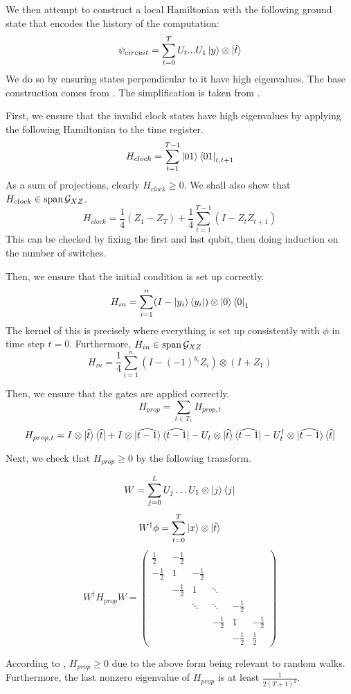 We then attempt to construct a local Hamiltonian with the following ground state that encodes the history of the computation: $$\psi_{circuit}=\sum_{t=0}^TU_t...U_1\ket{y}\otimes\ket{\hat{t}}$$
We do so by ensuring states perpendicular to it have high eigenvalues. The base construction comes from \cite{kitaev2002classical}. The simplification is taken from \cite{PhysRevA.78.012352}.

First, we ensure that the invalid clock states have high eigenvalues by applying the following Hamiltonian to the time register.
$$H_{clock}=\sum_{t=1}^{T-1}\ket{01}\bra{01}_{t,t+1}$$
As a sum of projections, clearly $H_{clock}\geq 0$. We shall also show that $H_{clock}\in\operatorname*{\operatorname{span}}\mathcal{G}_{XZ}$.
$$H_{clock}=\frac{1}{4}(Z_1 - Z_T) + \frac{1}{4}\sum_{t=1}^{T-1}(I-Z_tZ_{t+1}) $$
This can be checked by fixing the first and last qubit, then doing induction on the number of switches.

Then, we ensure that the initial condition is set up correctly.
$$H_{in}=\sum_{i=1}^n(I-\ket{y_i}\bra{y_i})\otimes\ket{0}\bra{0}_1$$
The kernel of this is precisely where everything is set up consistently with $\phi$ in time step $t=0$. Furthermore, $H_{in}\in\operatorname*{\operatorname{span}}\mathcal{G}_{XZ}$
$$H_{in}=\frac{1}{4}\sum_{i=1}^n(I-(-1)^{y_i}Z_i)\otimes(I+Z_1)$$

Then, we ensure that the gates are applied correctly.
$$H_{prop}=\sum_{t\in T_1}H_{prop,t}$$
$$H_{prop,t}=I\otimes\ket{\widehat{t}}\bra{\widehat{t}}
	+I\otimes\ket{\widehat{t-1}}\bra{\widehat{t-1}}
	-U_t\otimes\ket{\widehat{t}}\bra{\widehat{t-1}}
	-U_t^\dagger\otimes\ket{\widehat{t-1}}\bra{\widehat{t}}$$

Next, we check that $H_{prop}\geq0$ by the following transform.

$$W=\sum_{j=0}^L U_j\ldots U_1\otimes\ket{j}\bra{j}$$
$$W^\dagger\phi=\sum_{t=0}^T\ket{x}\otimes\ket{\hat{t}}$$
$$W^\dagger H_{prop} W=
\begin{pmatrix}
	\frac{1}{2} & -\frac{1}{2} & & & &  \\
	-\frac{1}{2} & 1 & -\frac{1}{2} & & & \\
	& -\frac{1}{2} & 1 & \ddots & & \\
	& & \ddots & \ddots & -\frac{1}{2} & \\
	& & & -\frac{1}{2} & 1 & -\frac{1}{2} \\
	& & & & -\frac{1}{2} & \frac{1}{2}
\end{pmatrix}$$

According to \cite{2002quant.ph.10077A}, $H_{prop}\geq 0$ due to the above form being relevant to random walks. Furthermore, the last nonzero eigenvalue of $H_{prop}$ is at least $\frac{1}{2(T+1)^2}$.

